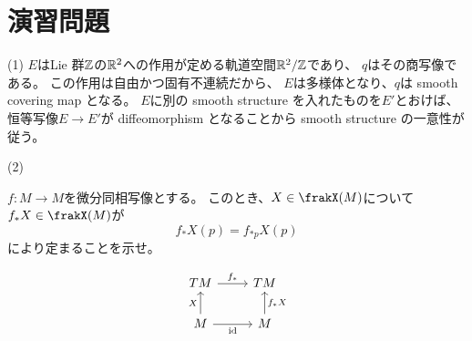 \documentclass[report]{jlreq}
\begin{document}
\section{演習問題}


\begin{answer}
    (1) $E$はLie 群$\mathbb{Z}$の$\mathbb{R}^2$への{\smooth}作用が定める軌道空間$\mathbb{R}^2/\mathbb{Z}$であり、
    $q$はその商写像である。
    この作用は自由かつ固有不連続だから、
    $E$は多様体となり、$q$は smooth covering map となる。
    $E$に別の smooth structure を入れたものを$E'$とおけば、
    恒等写像$E \to E'$が diffeomorphism となることから
    smooth structure の一意性が従う。

    (2)
    \TODO{}
\end{answer}

\begin{problem}
    $f \colon M \to M$を微分同相写像とする。
    このとき、$X \in \frakX(M)$について
    $f_*X \in \frakX(M)$が
    \begin{equation}
        f_* X(p) = f_{*p} X(p)
    \end{equation}
    により定まることを示せ。
\end{problem}

\begin{answer}
    \begin{equation}
        \begin{tikzcd}
            TM \ar{r}{f_*} & TM \\
            M \ar{u}{X} \ar{r}[swap]{\id} & M \ar{u}[swap]{f_* X}
        \end{tikzcd}
    \end{equation}
\end{answer}
\end{document}
